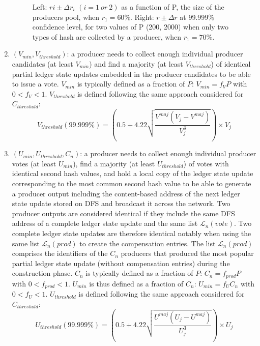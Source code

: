 \begin{enumerate}
\begin{figure}[H]
\begin{subfigure}[b]{0.45\textwidth}
        \label{fig:rdeltara}
    \end{subfigure}
    \vspace*{-0.2in}
    \caption{Left: $ri \pm \Delta r_i$ $(i=1~or~2)$ as a function of P, the size of the producers pool, when $r_1 = 60\%$. Right: $r \pm \Delta r$ at 99.999\% confidence level, for two values of P (200, 2000) when only two types of hash are collected by a producer, when $r_1 = 70\%$.}
    \label{fig:rdeltar}
\end{figure}


\item $(V_{min}, V_{threshold})$: a producer needs to collect enough individual producer candidates (at least $V_{min}$) and find a majority (at least $V_{threshold}$) of identical partial ledger state updates embedded in the producer candidates to be able to issue a vote. 
$V_{min}$ is typically defined as a fraction of $P$: $V_{min} = f_V P$ with $0 < f_V < 1$. $V_{threshold}$ is defined following the same approach considered for $C_{threshold}$: 
 \begin{equation}
 V_{threshold}(99.999\%) = \left( 0.5 + 4.22\sqrt{\frac{V^{maj}(V_j-V^{maj})}{V_j^3}} \right) \times V_j
 \end{equation}
 
 \item $(U_{min}, U_{threshold}, C_n)$: a producer needs to collect enough individual producer votes (at least $U_{min}$), find a majority (at least $U_{threshold}$) of votes with identical second hash values, and hold a local copy of the ledger state update corresponding to the most common second hash value to be able to generate a producer output including the content-based address of the next ledger state update stored on DFS and broadcast it across the network. Two producer outputs are considered identical if they include the same DFS address of a complete ledger state update and the same list $\mathcal{L}_n(vote)$. Two complete ledger state updates are therefore identical notably when using the same list $\mathcal{L}_{n}(prod)$ to create the compensation entries. The list $\mathcal{L}_{n}(prod)$ comprises the identifiers of the $C_n$ producers that produced the most popular partial ledger state update (without compensation entries) during the construction phase. $C_{n}$ is typically defined as a fraction of $P$: $C_{n} = f_{prod}P$ with $0 < f_{prod} < 1$.
 $U_{min}$ is thus defined as a fraction of $C_n$: $U_{min} = f_U C_n$ with $0 < f_U < 1$. 
 $U_{threshold}$ is defined following the same approach considered for $C_{threshold}$: 
 \begin{equation}
 U_{threshold}(99.999\%) = \left( 0.5 +  4.22\sqrt{\frac{U^{maj}(U_j-U^{maj})}{U_j^3}} \right) \times U_j
 \end{equation}

\end{enumerate}

